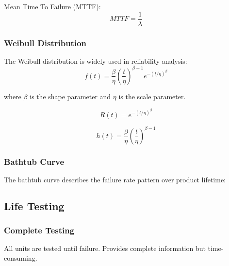\documentclass[twoside]{book}
\begin{document}
Mean Time To Failure (MTTF):
$$MTTF = \frac{1}{\lambda}$$

\subsubsection{Weibull Distribution}

The Weibull distribution is widely used in reliability analysis:
$$f(t) = \frac{\beta}{\eta}\left(\frac{t}{\eta}\right)^{\beta-1} e^{-(t/\eta)^{\beta}}$$

where $\beta$ is the shape parameter and $\eta$ is the scale parameter.

$$R(t) = e^{-(t/\eta)^{\beta}}$$

$$h(t) = \frac{\beta}{\eta}\left(\frac{t}{\eta}\right)^{\beta-1}$$

\subsubsection{Bathtub Curve}

The bathtub curve describes the failure rate pattern over product lifetime:

\begin{figure}[H]
\centering
{}
\end{figure}

\subsection{Life Testing}

\subsubsection{Complete Testing}

All units are tested until failure. Provides complete information but time-consuming.
\end{document}
